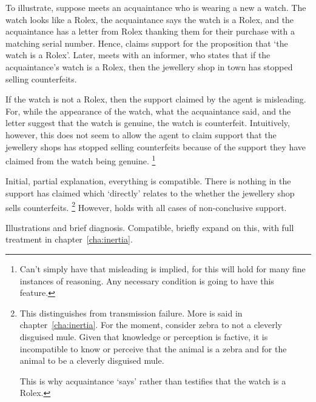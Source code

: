 \begin{note}
  To illustrate, suppose  meets an acquaintance who is wearing a new a watch.
  The watch looks like a Rolex, the acquaintance says the watch is a Rolex, and the acquaintance has a letter from Rolex thanking them for their purchase with a matching serial number.
  Hence,  claims support for the proposition that `the watch is a Rolex'.
  Later,  meets with an informer, who states that if the acquaintance's watch is a Rolex, then the jewellery shop in town has stopped selling counterfeits.

  If the watch is not a Rolex, then the support claimed by the agent is misleading.
  For, while the appearance of the watch, what the acquaintance said, and the letter suggest that the watch is genuine, the watch is counterfeit.
  Intuitively, however, this does not seem to allow the agent to claim support that the jewellery shops has stopped selling counterfeits because of the support they have claimed from the watch being genuine.\nolinebreak
  \footnote{
    Can't simply have that misleading is implied, for this will hold for many fine instances of reasoning.
    Any necessary condition is going to have this feature.
  }

  Initial, partial explanation, everything is compatible.
  There is nothing in the support   has claimed which `directly' relates to the whether the jewellery shop sells counterfeits.\nolinebreak
  \footnote{
    This distinguishes \nI{} from transmission failure.
    More is said in chapter~\ref{cha:inertia}.
    For the moment, consider zebra to not a cleverly disguised mule.
    Given that knowledge or perception is factive, it is incompatible to know or perceive that the animal is a zebra and for the animal to be a cleverly disguised mule.

    This is why acquaintance `says' rather than testifies that the watch is a Rolex.
  }
  However, holds with all cases of non-conclusive support.
\end{note}

\begin{note}[For \nI{}]
  Illustrations and brief diagnosis.
  Compatible, briefly expand on this, with full treatment in chapter~\ref{cha:inertia}.
\end{note}

